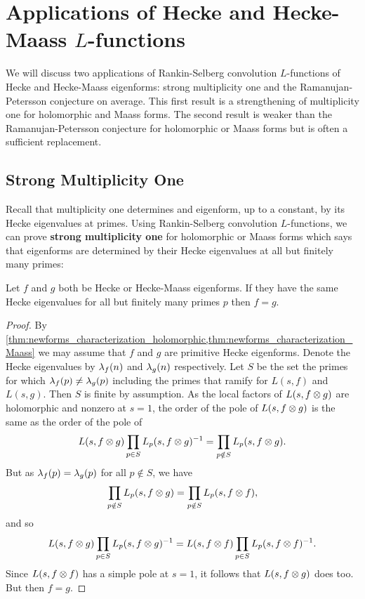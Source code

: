 \chapter{Applications of Hecke and Hecke-Maass \texorpdfstring{$L$}{L}-functions}
  We will discuss two applications of Rankin-Selberg convolution $L$-functions of Hecke and Hecke-Maass eigenforms: strong multiplicity one and the Ramanujan-Petersson conjecture on average. This first result is a strengthening of multiplicity one for holomorphic and Maass forms. The second result is weaker than the Ramanujan-Petersson conjecture for holomorphic or Maass forms but is often a sufficient replacement.
  \section{Strong Multiplicity One}
    Recall that multiplicity one determines and eigenform, up to a constant, by its Hecke eigenvalues at primes. Using Rankin-Selberg convolution $L$-functions, we can prove \textbf{strong multiplicity one} for holomorphic or Maass forms which says that eigenforms are determined by their Hecke eigenvalues at all but finitely many primes:

    \begin{theorem*}
      Let $f$ and $g$ both be Hecke or Hecke-Maass eigenforms. If they have the same Hecke eigenvalues for all but finitely many primes $p$ then $f = g$.
    \end{theorem*}
    \begin{proof}
      By \cref{thm:newforms_characterization_holomorphic,thm:newforms_characterization_Maass} we may assume that $f$ and $g$ are primitive Hecke eigenforms. Denote the Hecke eigenvalues by $\lambda_{f}(n)$ and $\lambda_{g}(n)$ respectively. Let $S$ be the set the primes for which $\lambda_{f}(p) \neq \lambda_{g}(p)$ including the primes that ramify for $L(s,f)$ and $L(s,g)$. Then $S$ is finite by assumption. As the local factors of $L(s,f \otimes g)$ are holomorphic and nonzero at $s = 1$, the order of the pole of $L(s,f \otimes g)$ is the same as the order of the pole of
      \[
        L(s,f \otimes g)\prod_{p \in S}L_{p}(s,f \otimes g)^{-1} = \prod_{p \notin S}L_{p}(s,f \otimes g).
      \]
      But as $\lambda_{f}(p) = \lambda_{g}(p)$ for all $p \notin S$, we have
      \[
        \prod_{p \notin S}L_{p}(s,f \otimes g) = \prod_{p \notin S}L_{p}(s,f \otimes f),
      \]
      and so
      \[
        L(s,f \otimes g)\prod_{p \in S}L_{p}(s,f \otimes g)^{-1} = L(s,f \otimes f)\prod_{p \in S}L_{p}(s,f \otimes f)^{-1}.
      \]
      Since $L(s,f \otimes f)$ has a simple pole at $s = 1$, it follows that $L(s,f \otimes g)$ does too. But then $f = g$.
    \end{proof}
